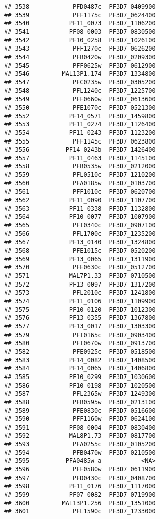 \documentclass{article}\usepackage[]{graphicx}\usepackage[]{color}
\makeatletter
\newenvironment{kframe}{%
 \def\at@end@of@kframe{}%
 \ifinner\ifhmode%
  \def\at@end@of@kframe{\end{minipage}}%
  \begin{minipage}{\columnwidth}%
 \fi\fi%
 \def\FrameCommand##1{\hskip\@totalleftmargin \hskip-\fboxsep
 \colorbox{shadecolor}{##1}\hskip-\fboxsep
     \hskip-\linewidth \hskip-\@totalleftmargin \hskip\columnwidth}%
 \MakeFramed {\advance\hsize-\width
   \@totalleftmargin\z@ \linewidth\hsize
   \@setminipage}}%
 {\par\unskip\endMakeFramed%
 \at@end@of@kframe}
\newenvironment{knitrout}{}{} %
\makeatother
\begin{document}
\begin{knitrout}
\begin{kframe}
\begin{verbatim}
## 3538            PFD0487c  PF3D7_0409900
## 3539            PFF1175c  PF3D7_0624400
## 3540           PF11_0073  PF3D7_1106200
## 3541           PF08_0003  PF3D7_0830500
## 3542           PF10_0258  PF3D7_1026100
## 3543            PFF1270c  PF3D7_0626200
## 3544            PFB0420w  PF3D7_0209300
## 3545            PFF0625w  PF3D7_0612900
## 3546         MAL13P1.174  PF3D7_1334800
## 3547            PFC0235w  PF3D7_0305200
## 3548            PFL1240c  PF3D7_1225700
## 3549            PFF0660w  PF3D7_0613600
## 3550            PFE1070c  PF3D7_0521300
## 3552           PF14_0571  PF3D7_1459800
## 3553           PF11_0274  PF3D7_1126400
## 3554           PF11_0243  PF3D7_1123200
## 3555            PFF1145c  PF3D7_0623800
## 3556          PF14_0243b  PF3D7_1426400
## 3557           PF11_0463  PF3D7_1145100
## 3558            PFB0535w  PF3D7_0212000
## 3559            PFL0510c  PF3D7_1210200
## 3560            PFA0185w  PF3D7_0103700
## 3561            PFF1010c  PF3D7_0620700
## 3562           PF11_0090  PF3D7_1107700
## 3563           PF11_0338  PF3D7_1132800
## 3564           PF10_0077  PF3D7_1007900
## 3565            PFI0340c  PF3D7_0907100
## 3566            PFL1700c  PF3D7_1235200
## 3567           PF13_0140  PF3D7_1324800
## 3568            PFE1015c  PF3D7_0520200
## 3569           PF13_0065  PF3D7_1311900
## 3570            PFE0630c  PF3D7_0512700
## 3571           MAL7P1.33  PF3D7_0710500
## 3572           PF13_0097  PF3D7_1317200
## 3573            PFL2010c  PF3D7_1241800
## 3574           PF11_0106  PF3D7_1109900
## 3575           PF10_0120  PF3D7_1012300
## 3576           PF13_0355  PF3D7_1367800
## 3577           PF13_0017  PF3D7_1303300
## 3579            PFI0165c  PF3D7_0903400
## 3580            PFI0670w  PF3D7_0913700
## 3582            PFE0925c  PF3D7_0518500
## 3583           PF14_0082  PF3D7_1408500
## 3584           PF14_0065  PF3D7_1406800
## 3585           PF10_0299  PF3D7_1030600
## 3586           PF10_0198  PF3D7_1020500
## 3587            PFL2365w  PF3D7_1249300
## 3588            PFB0595w  PF3D7_0213100
## 3589            PFE0830c  PF3D7_0516600
## 3590            PFF1160w  PF3D7_0624100
## 3591           PF08_0004  PF3D7_0830400
## 3592           MAL8P1.73  PF3D7_0817700
## 3593            PFA0255c  PF3D7_0105200
## 3594            PFB0470w  PF3D7_0210500
## 3595          PFA0485w-a           <NA>
## 3596            PFF0580w  PF3D7_0611900
## 3597            PFD0430c  PF3D7_0408700
## 3598           PF11_0176  PF3D7_1117000
## 3599           PF07_0082  PF3D7_0719900
## 3600         MAL13P1.256  PF3D7_1351000
## 3601            PFL1590c  PF3D7_1233000

\end{verbatim}
\end{kframe}
\end{knitrout}
\end{document}
